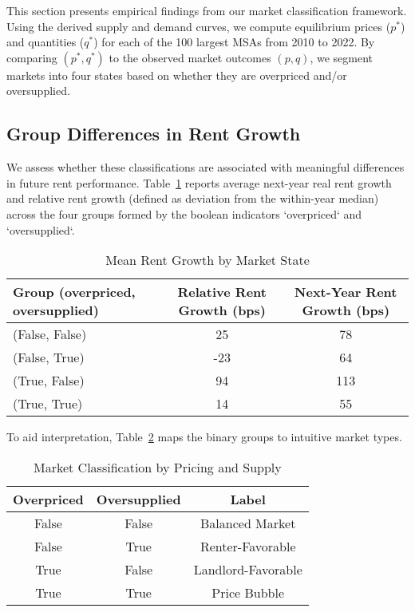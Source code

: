 \documentclass[sn-mathphys-num]{sn-jnl}%
\theoremstyle{thmstyleone}%
\theoremstyle{thmstyletwo}%
\theoremstyle{thmstylethree}%
\begin{document}
This section presents empirical findings from our market classification framework. Using the derived supply and demand curves, we compute equilibrium prices (\( p^* \)) and quantities (\( q^* \)) for each of the 100 largest MSAs from 2010 to 2022. By comparing \( (p^*, q^*) \) to the observed market outcomes \( (p, q) \), we segment markets into four states based on whether they are overpriced and/or oversupplied.

\subsection{Group Differences in Rent Growth}

We assess whether these classifications are associated with meaningful differences in future rent performance. Table~\ref{tab:simplifiedmeans} reports average next-year real rent growth and relative rent growth (defined as deviation from the within-year median) across the four groups formed by the boolean indicators `overpriced` and `oversupplied`.

\begin{table}[h!]
	\centering
	\caption{Mean Rent Growth by Market State}
	\label{tab:simplifiedmeans}
	\begin{tabular}{lcc}
		\toprule
		\textbf{Group (overpriced, oversupplied)} & \textbf{Relative Rent Growth (bps)} & \textbf{Next-Year Rent Growth (bps)} \\
		\midrule
		(False, False) & 25 & 78 \\
		(False, True)  & -23 & 64 \\
		(True, False)  & 94 & 113 \\
		(True, True)   & 14 & 55 \\
		\bottomrule
	\end{tabular}
\end{table}

To aid interpretation, Table~\ref{tab:matrixlabels} maps the binary groups to intuitive market types.

\begin{table}[h!]
	\centering
	\caption{Market Classification by Pricing and Supply}
	\label{tab:matrixlabels}
	\begin{tabular}{cc|c}
		\toprule
		\textbf{Overpriced} & \textbf{Oversupplied} & \textbf{Label} \\
		\midrule
		False & False & Balanced Market \\
		False & True & Renter-Favorable \\
		True  & False & Landlord-Favorable \\
		True  & True  & Price Bubble \\
		\bottomrule
	\end{tabular}
\end{table}
\end{document}

